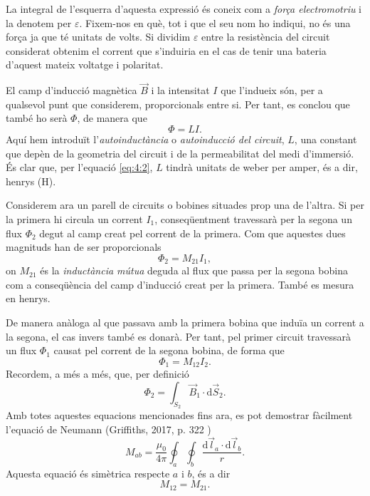\documentclass[a4paper,10.5pt]{report}
\begin{document}
La integral de l'esquerra d'aquesta expressió és coneix com a \textit{força electromotriu} i la denotem per $\varepsilon$. Fixem-nos en què, tot i que el seu nom ho indiqui, no és una força ja que té unitats de volts. Si dividim $\varepsilon$ entre la resistència del circuit considerat obtenim el corrent que s'induiria en el cas de tenir una bateria d'aquest mateix voltatge i polaritat.

El camp d'inducció magnètica $\Vec{B}$ i la intensitat $I$ que l'indueix són, per a qualsevol punt que considerem, proporcionals entre si. Per tant, es conclou que també ho serà $\Phi$, de manera que
\begin{equation}
	\Phi=LI \label{eq:4:2}.
\end{equation}
Aquí hem introduït l'\textit{autoinductància} o \textit{autoinducció del circuit}, $L$, una constant que depèn de la geometria del circuit i de la permeabilitat del medi d'immersió. És clar que, per l'equació \eqref{eq:4:2}, $L$ tindrà unitats de weber per amper, és a dir, henrys (H).

Considerem ara un parell de circuits o bobines situades prop una de l'altra. Si per la primera hi circula un corrent $I_1$, conseqüentment travessarà per la segona un flux $\Phi_2$ degut al camp creat pel corrent de la primera. Com que aquestes dues magnituds han de ser proporcionals
\begin{equation}
	\Phi_2=M_{21}I_1 \label{eq:4:3},
\end{equation}
on $M_{21}$ és la \textit{inductància mútua} deguda al flux que passa per la segona bobina com a conseqüència del camp d'inducció creat per la primera. També es mesura en henrys. 

De manera anàloga al que passava amb la primera bobina que induïa un corrent a la segona, el cas invers també es donarà. Per tant, pel primer circuit travessarà un flux $\Phi_1$ causat pel corrent de la segona bobina, de forma que
\begin{equation}
	\Phi_1=M_{12}I_2 \label{eq:4:4}.
\end{equation}
Recordem, a més a més, que, per definició
\begin{equation}
	\Phi_2=\int_{S_2}\vec{B}_1 \cdot \mathrm{d}\Vec{S}_2 \label{eq:4:5}.
\end{equation}
Amb totes aquestes equacions mencionades fins ara, es pot demostrar fàcilment l'equació de Neumann (Griffiths, 2017, p. 322 \cite{ref4})
\begin{equation}
	M_{ab}=\frac{\mu_0}{4\pi}\oint_a\oint_b\frac{\mathrm{d}\Vec{l}_a\cdot\mathrm{d}\Vec{l}_b}{r} \label{eq:4:6}.
\end{equation}
Aquesta equació és simètrica respecte $a$ i $b$, és a dir
\begin{equation}
	M_{12}=M_{21}. \label{eq:4:7}
\end{equation}
\end{document}
